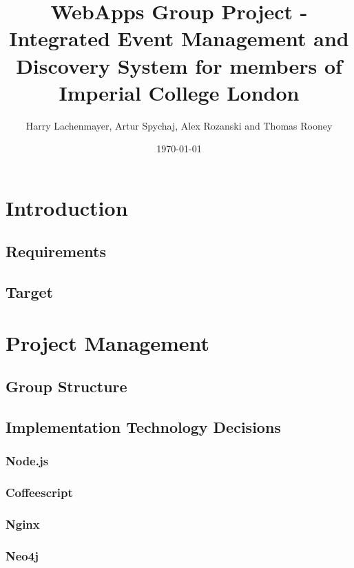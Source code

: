 \documentclass[a4wide, 11pt]{article}
\begin{document}
\title{WebApps Group Project - Integrated Event Management and Discovery System for members of Imperial College London}

\author{Harry Lachenmayer, Artur Spychaj, Alex Rozanski and Thomas Rooney}

\date{\today}         %

\maketitle            %

\section {Introduction}

\subsection {Requirements}
\subsection {Target}

\section {Project Management}

\subsection {Group Structure}

\subsection {Implementation Technology Decisions}
\subsubsection {Node.js}
\subsubsection {Coffeescript}
\subsubsection {Nginx}
\subsubsection {Neo4j}
\end{document}
